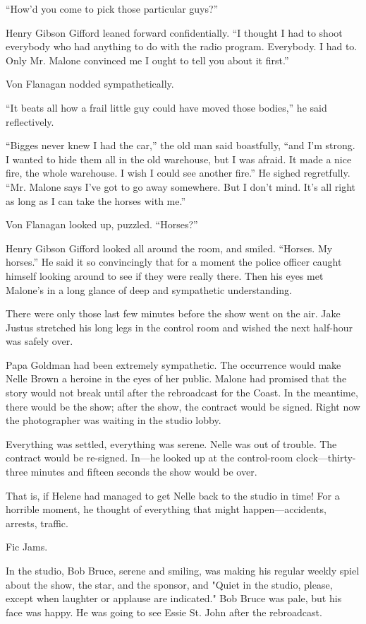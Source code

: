 \documentclass{novel}
\begin{document}
“How’d you come to pick those particular guys?”

Henry Gibson Gifford leaned forward confidentially. “I thought I had to shoot everybody who had anything to do with the radio program. Everybody. I had to. Only Mr. Malone convinced me I ought to tell you about it first.”

Von Flanagan nodded sympathetically.

“It beats all how a frail little guy could have moved those bodies,” he said reflectively.

“Bigges never knew I had the car,” the old man said boastfully, “and I’m strong. I wanted to hide them all in the old warehouse, but I was afraid. It made a nice fire, the whole warehouse. I wish I could see another fire.” He sighed regretfully. “Mr. Malone says I’ve got to go away somewhere. But I don’t mind. It’s all right as long as I can take the horses with me.”

Von Flanagan looked up, puzzled. “Horses?”

Henry Gibson Gifford looked all around the room, and smiled. “Horses. My horses.” He said it so convincingly that for a moment the police officer caught himself looking around to see if they were really there. Then his eyes met Malone’s in a long glance of deep and sympathetic understanding.

There were only those last few minutes before the show went on the air. Jake Justus stretched his long legs in the control room and wished the next half-hour was safely over.

Papa Goldman had been extremely sympathetic. The occurrence would make Nelle Brown a heroine in the eyes of her public. Malone had promised that the story would not break until after the rebroadcast for the Coast. In the meantime, there would be the show; after the show, the contract would be signed. Right now the photographer was waiting in the studio lobby.

Everything was settled, everything was serene. Nelle was out of trouble. The contract would be re-signed. In—he looked up at the control-room clock—thirty-three minutes and fifteen seconds the show would be over.

That is, if Helene had managed to get Nelle back to the studio in time! For a horrible moment, he thought of everything that might happen—accidents, arrests, traffic.

Fic Jams.

In the studio, Bob Bruce, serene and smiling, was making his regular weekly spiel about the show, the star, and the sponsor, and "Quiet in the studio, please, except when laughter or applause are indicated." Bob Bruce was pale, but his face was happy. He was going to see Essie St. John after the rebroadcast.
\end{document}
